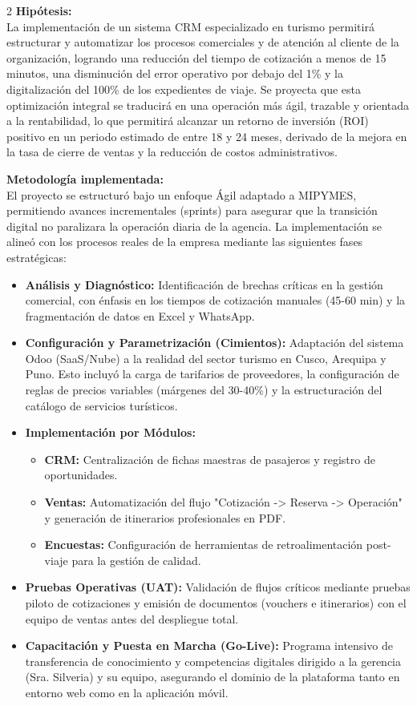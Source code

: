 \documentclass[12pt]{article}
\begin{document}
\begin{multicols}{2}
\textbf{Hipótesis:}\\
La implementación de un sistema CRM especializado en turismo permitirá estructurar y automatizar los procesos comerciales y de atención al cliente de la organización, logrando una reducción del tiempo de cotización a menos de 15 minutos, una disminución del error operativo por debajo del 1\% y la digitalización del 100\% de los expedientes de viaje. Se proyecta que esta optimización integral se traducirá en una operación más ágil, trazable y orientada a la rentabilidad, lo que permitirá alcanzar un retorno de inversión (ROI) positivo en un periodo estimado de entre 18 y 24 meses, derivado de la mejora en la tasa de cierre de ventas y la reducción de costos administrativos.

\textbf{Metodología implementada:}\\
El proyecto se estructuró bajo un enfoque Ágil adaptado a MIPYMES, permitiendo avances incrementales (sprints) para asegurar que la transición digital no paralizara la operación diaria de la agencia. La implementación se alineó con los procesos reales de la empresa mediante las siguientes fases estratégicas:
\begin{itemize}
    \item \textbf{Análisis y Diagnóstico:} Identificación de brechas críticas en la gestión comercial, con énfasis en los tiempos de cotización manuales (45-60 min) y la fragmentación de datos en Excel y WhatsApp.
    \item \textbf{Configuración y Parametrización (Cimientos):} Adaptación del sistema Odoo (SaaS/Nube) a la realidad del sector turismo en Cusco, Arequipa y Puno. Esto incluyó la carga de tarifarios de proveedores, la configuración de reglas de precios variables (márgenes del 30-40\%) y la estructuración del catálogo de servicios turísticos.
    \item \textbf{Implementación por Módulos:}
    \begin{itemize}
        \item \textbf{CRM:} Centralización de fichas maestras de pasajeros y registro de oportunidades.
        \item \textbf{Ventas:} Automatización del flujo "Cotización -> Reserva -> Operación" y generación de itinerarios profesionales en PDF.
        \item \textbf{Encuestas:} Configuración de herramientas de retroalimentación post-viaje para la gestión de calidad.
    \end{itemize}
    \item \textbf{Pruebas Operativas (UAT):} Validación de flujos críticos mediante pruebas piloto de cotizaciones y emisión de documentos (vouchers e itinerarios) con el equipo de ventas antes del despliegue total.
    \item \textbf{Capacitación y Puesta en Marcha (Go-Live):} Programa intensivo de transferencia de conocimiento y competencias digitales dirigido a la gerencia (Sra. Silveria) y su equipo, asegurando el dominio de la plataforma tanto en entorno web como en la aplicación móvil.
\end{itemize}


\end{multicols}
\end{document}
